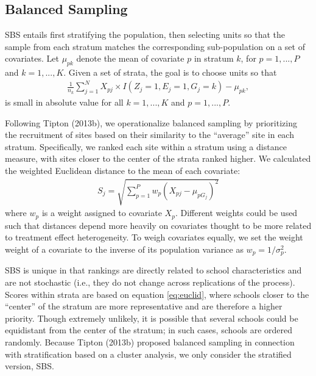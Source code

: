 \documentclass[english,man,floatsintext]{apa6}
\begin{document}
\hypertarget{balanced-sampling}{%
\subsection{Balanced Sampling}\label{balanced-sampling}}

SBS entails first stratifying the population, then selecting units so that the sample from each stratum matches the corresponding sub-population on a set of covariates. Let \(\mu_{p k}\) denote the mean of covariate \(p\) in stratum \(k\), for \(p = 1,...,P\) and \(k = 1,...,K\). Given a set of strata, the goal is to choose units so that
\begin{align}
\frac{1}{n_k} \sum_{j=1}^N X_{pj} \times I\left(Z_j = 1, E_j = 1, G_j = k\right) - \mu_{p k},
\end{align}
is small in absolute value for all \(k = 1,...,K\) and \(p = 1,...,P\).

Following Tipton (2013b), we operationalize balanced sampling by prioritizing the recruitment of sites based on their similarity to the \enquote{average} site in each stratum.
Specifically, we ranked each site within a stratum using a distance measure, with sites closer to the center of the strata ranked higher. We calculated the weighted Euclidean distance to the mean of each covariate:
\begin{align} \label{eq:euclid}
S_j = \sqrt{\sum^P_{p=1}w_p(X_{pj} - \mu_{p G_j})^2}
\end{align}
where \(w_p\) is a weight assigned to covariate \(X_p\). Different weights could be used such that distances depend more heavily on covariates thought to be more related to treatment effect heterogeneity. To weigh covariates equally, we set the weight weight of a covariate to the inverse of its population variance as \(w_p = 1/\sigma^2_p\).

SBS is unique in that rankings are directly related to school characteristics and are not stochastic (i.e., they do not change across replications of the process).
Scores within strata are based on equation \eqref{eq:euclid}, where schools closer to the \enquote{center} of the stratum are more representative and are therefore a higher priority. Though extremely unlikely, it is possible that several schools could be equidistant from the center of the stratum; in such cases, schools are ordered randomly. Because Tipton (2013b) proposed balanced sampling in connection with stratification based on a cluster analysis, we only consider the stratified version, SBS.
\end{document}
